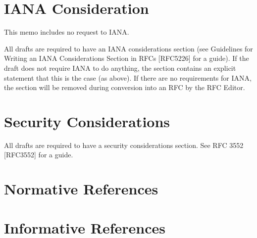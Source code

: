 \documentclass[10pt]{article}
\begin{document}
{\section{IANA Consideration}

This memo includes no request to IANA.

All drafts are required to have an IANA considerations section (see Guidelines for Writing an IANA Considerations Section in RFCs [RFC5226] for a guide).  If the draft does not require IANA to do anything, the section contains an explicit statement that this is the case (as above).  If there are no requirements for IANA, the section  will be removed during conversion into an RFC by the RFC Editor.

\section{Security Considerations}


All drafts are required to have a security considerations section. See RFC 3552 [RFC3552] for a guide.

\section{Normative References}

\section{Informative References}



}
\end{document}
